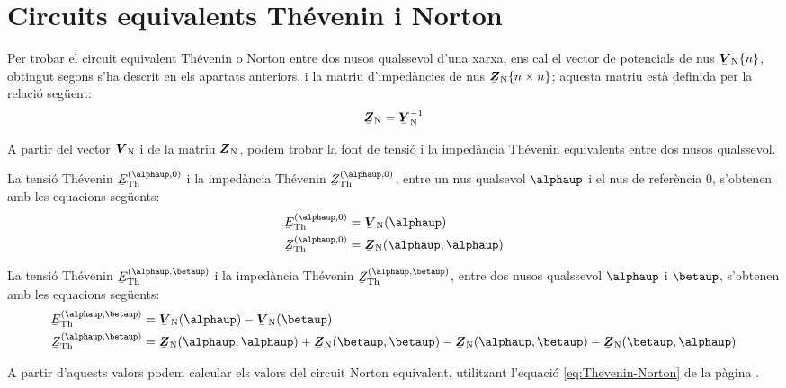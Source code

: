\section{Circuits equivalents Th\'{e}venin i Norton}   \label{sec:xarxes_Zth}

Per trobar el
circuit equivalent Th\'{e}venin o Norton entre dos nusos qualssevol
d'una xarxa, ens cal el vector de potencials de nus
$\mcmplx{V}\ped{N}\{n\}$, obtingut segons s'ha descrit en els
apartats anteriors, i la matriu d'imped\`{a}ncies de nus
$\mcmplx{Z}\ped{N}\{n\times n\}$; aquesta matriu est\`{a} definida per
la relaci\'{o} seg\"{u}ent:
\begin{equation}
   \mcmplx{Z}\ped{N} = \mcmplx{Y}\ped{N}^{-1}
\end{equation}

A partir del vector $\mcmplx{V}\ped{N}$ i de la matriu
$\mcmplx{Z}\ped{N}$, podem trobar la font de tensi\'{o} i la imped\`{a}ncia
Th\'{e}venin equivalents entre dos nusos qualssevol.

La tensi\'{o} Th\'{e}venin $\cmplx{E}\ped{Th}^{(\alphaup,0)}$ i la imped\`{a}ncia
Th\'{e}venin $\cmplx{Z}\ped{Th}^{(\alphaup,0)}$, entre  un nus qualsevol
$\alphaup$ i el nus de refer\`{e}ncia 0, s'obtenen amb les equacions
seg\"{u}ents:
\begin{align}
    \cmplx{E}\ped{Th}^{(\alphaup,0)} &= \mcmplx{V}\ped{N}(\alphaup) \\
    \cmplx{Z}\ped{Th}^{(\alphaup,0)} &= \mcmplx{Z}\ped{N}(\alphaup,\alphaup)
\end{align}

La tensi\'{o} Th\'{e}venin $\cmplx{E}\ped{Th}^{(\alphaup,\betaup)}$ i la
imped\`{a}ncia Th\'{e}venin $\cmplx{Z}\ped{Th}^{(\alphaup,\betaup)}$, entre dos
nusos qualssevol $\alphaup$ i $\betaup$, s'obtenen amb les equacions
seg\"{u}ents:
\begin{align}
    \cmplx{E}\ped{Th}^{(\alphaup,\betaup)} &= \mcmplx{V}\ped{N}(\alphaup) - \mcmplx{V}\ped{N}(\betaup) \\
    \cmplx{Z}\ped{Th}^{(\alphaup,\betaup)} &= \mcmplx{Z}\ped{N}(\alphaup,\alphaup) +
    \mcmplx{Z}\ped{N}(\betaup,\betaup) - \mcmplx{Z}\ped{N}(\alphaup,\betaup) -
    \mcmplx{Z}\ped{N}(\betaup,\alphaup)
\end{align}

A partir d'aquests valors podem calcular els valors del circuit Norton equivalent, utilitzant l'equaci\'{o} \eqref{eq:Thevenin-Norton} de la p\`{a}gina \pageref{eq:Thevenin-Norton}.


